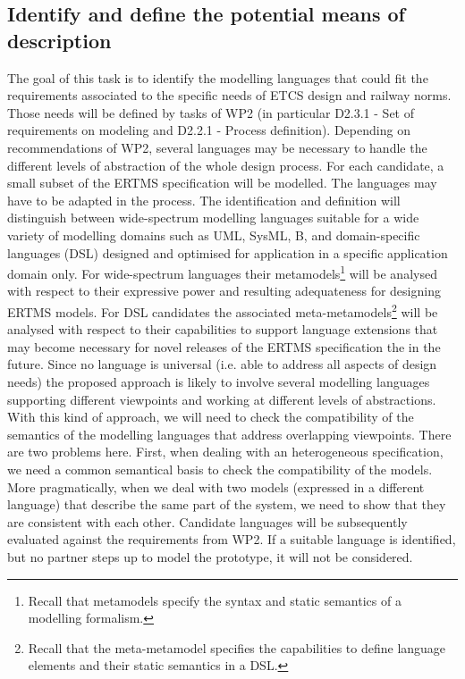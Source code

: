 \documentclass{template/openetcs_article}
\begin{document}
\subsection{Identify and define the potential means of description}
\label{sec:language}

The goal of this task is to identify the modelling languages that
could fit the requirements associated to the specific needs of ETCS
design and railway norms. Those needs will be defined by tasks of WP2 
(in particular D2.3.1 - Set of requirements on modeling and 
D2.2.1 - Process definition). 
Depending on recommendations of WP2, several languages may
be necessary to handle the different levels of abstraction of the
whole design process.  For each candidate, a small subset of the ERTMS
specification will be modelled. The languages may have to be adapted
in the process. The identification and definition will distinguish
between wide-spectrum modelling languages suitable for a wide variety
of modelling domains such as UML, SysML, B, and domain-specific
languages (DSL) designed and optimised for application in a specific
application domain only.  For wide-spectrum languages their
metamodels\footnote{Recall that metamodels specify the syntax and
  static semantics of a modelling formalism.} will be analysed with
respect to their expressive power and resulting adequateness for
designing ERTMS models.  For DSL candidates the associated
meta-metamodels\footnote{Recall that the meta-metamodel specifies the
  capabilities to define language elements and their static semantics
  in a DSL.}  will be analysed with respect to their capabilities to
support language extensions that may become necessary for novel
releases of the ERTMS specification the in the future.  Since no
language is universal (i.e. able to address all aspects of
design needs) the proposed approach is likely to involve several
modelling languages supporting different viewpoints and working at
different levels of abstractions. With this kind of approach, we will
need to check the compatibility of the semantics of the modelling
languages that address overlapping viewpoints. There are two problems
here. First, when dealing with an heterogeneous specification, we need
a common semantical basis to check the compatibility of the
models. More pragmatically, when we deal with two models (expressed in
a different language) that describe the same part of the system, we
need to show that they are consistent with each other. Candidate
languages will be subsequently evaluated against the requirements from
WP2.  If a suitable language is identified, but no partner steps up to
model the prototype, it will not be considered.
\end{document}
